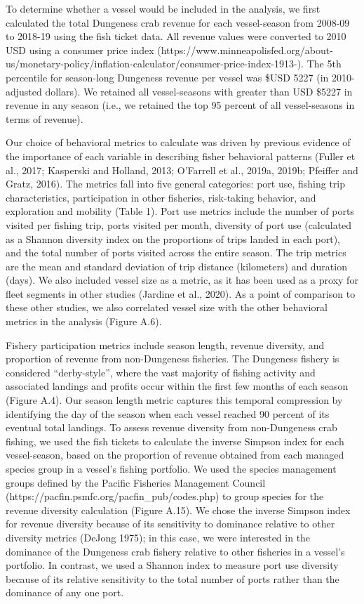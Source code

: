 \documentclass[]{elsarticle} %
\begin{document}
To determine whether a vessel would be included in the analysis, we
first calculated the total Dungeness crab revenue for each vessel-season
from 2008-09 to 2018-19 using the fish ticket data. All revenue values
were converted to 2010 USD using a consumer price index
(https://www.minneapolisfed.org/about-us/monetary-policy/inflation-calculator/consumer-price-index-1913-).
The 5th percentile for season-long Dungeness revenue per vessel was
\$USD 5227 (in 2010-adjusted dollars). We retained all vessel-seasons
with greater than USD \$5227 in revenue in any season (i.e., we retained
the top 95 percent of all vessel-seasons in terms of revenue).

Our choice of behavioral metrics to calculate was driven by previous
evidence of the importance of each variable in describing fisher
behavioral patterns (Fuller et al., 2017; Kasperski and Holland, 2013;
O'Farrell et al., 2019a, 2019b; Pfeiffer and Gratz, 2016). The metrics
fall into five general categories: port use, fishing trip
characteristics, participation in other fisheries, risk-taking behavior,
and exploration and mobility (Table 1). Port use metrics include the
number of ports visited per fishing trip, ports visited per month,
diversity of port use (calculated as a Shannon diversity index on the
proportions of trips landed in each port), and the total number of ports
visited across the entire season. The trip metrics are the mean and
standard deviation of trip distance (kilometers) and duration (days). We
also included vessel size as a metric, as it has been used as a proxy
for fleet segments in other studies (Jardine et al., 2020). As a point
of comparison to these other studies, we also correlated vessel size
with the other behavioral metrics in the analysis (Figure A.6).

Fishery participation metrics include season length, revenue diversity,
and proportion of revenue from non-Dungeness fisheries. The Dungeness
fishery is considered ``derby-style'', where the vast majority of
fishing activity and associated landings and profits occur within the
first few months of each season (Figure A.4). Our season length metric
captures this temporal compression by identifying the day of the season
when each vessel reached 90 percent of its eventual total landings. To
assess revenue diversity from non-Dungeness crab fishing, we used the
fish tickets to calculate the inverse Simpson index for each
vessel-season, based on the proportion of revenue obtained from each
managed species group in a vessel's fishing portfolio. We used the
species management groups defined by the Pacific Fisheries Management
Council (https://pacfin.psmfc.org/pacfin\_pub/codes.php) to group
species for the revenue diversity calculation (Figure A.15). We chose
the inverse Simpson index for revenue diversity because of its
sensitivity to dominance relative to other diversity metrics (DeJong
1975); in this case, we were interested in the dominance of the
Dungeness crab fishery relative to other fisheries in a vessel's
portfolio. In contrast, we used a Shannon index to measure port use
diversity because of its relative sensitivity to the total number of
ports rather than the dominance of any one port.
\end{document}
